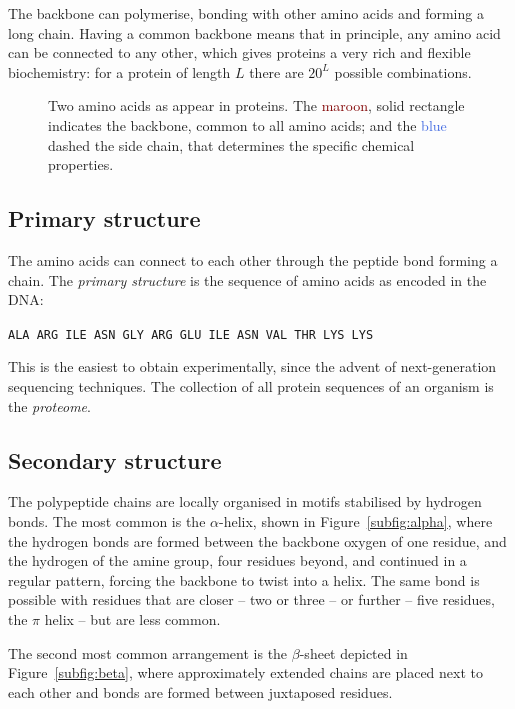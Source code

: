 The backbone can polymerise, bonding with other amino acids and forming a long chain.
Having a common backbone means that in principle, any amino acid can be connected to any other, which gives proteins a very rich and flexible biochemistry:
for a protein of length $L$ there are $20^L$ possible combinations. %

\begin{figure}
\centering
\hfil %
\hfil %
\hfil %
\caption{Two amino acids as appear in proteins.
The \textcolor{Maroon}{maroon}, solid rectangle indicates the backbone, common to all amino acids; and the \textcolor{RoyalBlue}{blue} dashed the side chain, that determines the specific chemical properties.}\label{fig:amino_acids}
\end{figure}

\subsection{Primary structure}
The amino acids can connect to each other through the peptide bond forming a chain.
The \emph{primary structure} is the sequence of amino acids as encoded in the DNA:
\begin{center}
\texttt{ALA ARG ILE ASN GLY ARG GLU ILE ASN VAL THR LYS LYS}
\end{center}

This is the easiest to obtain experimentally, since the advent of next-generation sequencing techniques.
The collection of all protein sequences of an organism is the \emph{proteome}.


\subsection{Secondary structure}
The polypeptide chains are locally organised in motifs stabilised by hydrogen bonds.
The most common is the $\alpha$-helix, \marginpar{$\alpha$} shown in Figure~\ref{subfig:alpha}, where the hydrogen bonds are formed between the backbone oxygen of one residue, and the hydrogen of the amine group, four residues beyond, and continued in a regular pattern, forcing the backbone to twist into a helix.
The same bond is possible with residues that are closer -- two or three -- or further  -- five residues, the $\pi$ helix -- but are less common.

The second most common arrangement is the $\beta$-sheet  \marginpar{$\beta$} depicted in Figure~\ref{subfig:beta}, where approximately extended chains are placed next to each other and bonds are formed between juxtaposed residues.

